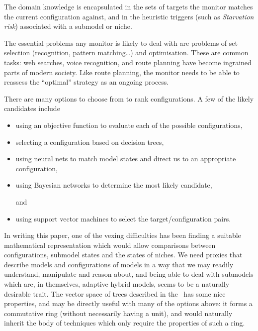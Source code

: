 The domain knowledge is encapsulated in the sets of targets the
monitor matches the current con\-fig\-ur\-a\-tion against, and in the
heuristic triggers (such as \emph{Starvation risk}) associated with a
sub\-model or niche.

The essential problems any monitor is likely to deal with are
problems of set selection (recognition, pattern matching\ldots) and
optimisation.  These are common tasks: web searches, voice
recognition, and route planning have become ingrained parts of modern
society. Like route planning, the monitor needs to be able to reassess
the ``optimal'' strategy as an ongoing process.


There are many options to choose from to rank con\-fig\-ur\-a\-tions. A few of
the likely candidates include
\begin{itemize}
  \item using an objective function to evaluate each of the possible
    con\-fig\-ur\-a\-tions,
  \item selecting a con\-fig\-ur\-a\-tion based
    on decision trees,
  \item
    using neural nets to match model states and direct
    us to an appropriate con\-fig\-ur\-a\-tion,
  \item using Bayesian networks to determine the most likely
    candidate,
  \item[and]
  \item using support vector machines to select the
    target/con\-fig\-ur\-a\-tion pairs.
\end{itemize}

In writing this paper, one of the vexing difficulties has been finding
a suitable math\-e\-mat\-i\-cal rep\-re\-sen\-ta\-tion which would allow comparisons
between con\-fig\-ur\-a\-tions, sub\-model states and the states of niches.  We
need proxies that describe models and con\-fig\-ur\-a\-tions of models in a
way that we may readily understand, manipulate and reason about, and
being able to deal with sub\-models which are, in themselves, adaptive
hybrid models, seems to be a naturally desirable trait.  The vector
space of trees described in the \appendixname\ has some nice
properties, and may be directly useful with many of the options above:
it forms a commutative ring (without necessarily having a unit), and
would naturally inherit the body of techniques which only require the
properties of such a ring.


